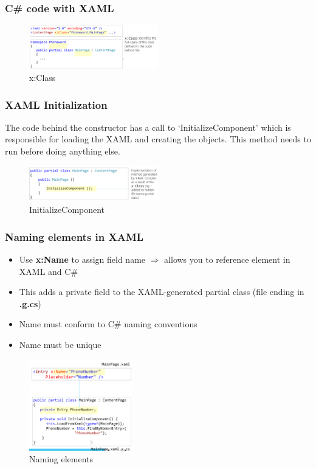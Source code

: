 \documentclass{article}
\newcommand{\bold}[1]{\textbf{#1}}
\begin{document}
\subsubsection{C\# code with XAML}

\begin{figure}[H]
    \centering
    \includegraphics[width=0.5\textwidth]{xaml05.png}
    \caption{x:Class}
\end{figure}

\subsubsection{XAML Initialization}

The code behind the constructor has a call to `InitializeComponent' 
which is responsible for loading the XAML and creating the objects.
This method needs to run before doing anything else.

\begin{figure}[H]
    \centering
    \includegraphics[width=0.5\textwidth]{xaml06.png}
    \caption{InitializeComponent}
\end{figure}

\subsubsection{Naming elements in XAML}

\begin{itemize}
    \item Use \bold{x:Name} to assign field name $\Rightarrow$ allows you to reference element in XAML and C\#
    \item This adds a private field to the XAML-generated partial class (file ending in \bold{.g.cs})
    \item Name must conform to C\# naming conventions
    \item Name must be unique
\end{itemize}

\begin{figure}[H]
    \centering
    \includegraphics[width=0.4\textwidth]{xaml07.png}
    \caption{Naming elements}
\end{figure}
\end{document}

